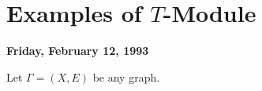 \documentclass[
]{book}
\theoremstyle{definition}
\theoremstyle{definition}
\theoremstyle{definition}
\theoremstyle{definition}
\theoremstyle{remark}
\begin{document}
\hypertarget{lec11}{%
\chapter{\texorpdfstring{Examples of \(T\)-Module}{Examples of T-Module}}\label{lec11}}

\textbf{Friday, February 12, 1993}

Let \(\Gamma = (X, E)\) be any graph.

  

\printindex
\end{document}
